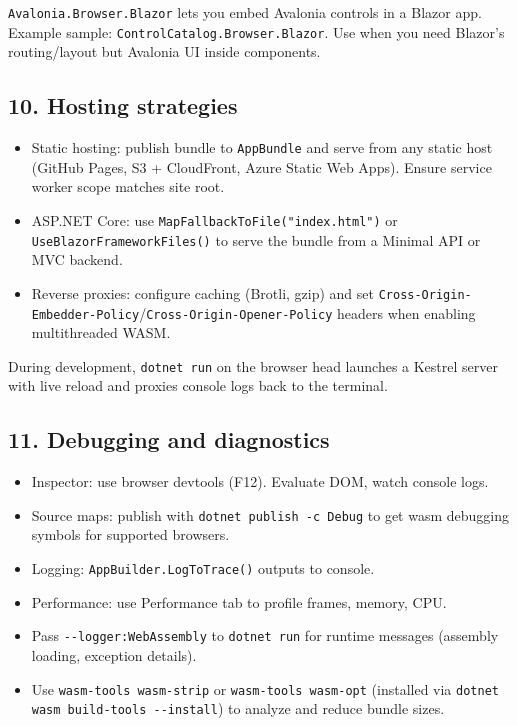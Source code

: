 \passthrough{\lstinline!Avalonia.Browser.Blazor!} lets you embed
Avalonia controls in a Blazor app. Example sample:
\passthrough{\lstinline!ControlCatalog.Browser.Blazor!}. Use when you
need Blazor's routing/layout but Avalonia UI inside components.

\subsection{10. Hosting strategies}\label{hosting-strategies}

\begin{itemize}
\tightlist
\item
  Static hosting: publish bundle to \passthrough{\lstinline!AppBundle!}
  and serve from any static host (GitHub Pages, S3 + CloudFront, Azure
  Static Web Apps). Ensure service worker scope matches site root.
\item
  ASP.NET Core: use
  \passthrough{\lstinline!MapFallbackToFile("index.html")!} or
  \passthrough{\lstinline!UseBlazorFrameworkFiles()!} to serve the
  bundle from a Minimal API or MVC backend.
\item
  Reverse proxies: configure caching (Brotli, gzip) and set
  \passthrough{\lstinline!Cross-Origin-Embedder-Policy!}/\passthrough{\lstinline!Cross-Origin-Opener-Policy!}
  headers when enabling multithreaded WASM.
\end{itemize}

During development, \passthrough{\lstinline!dotnet run!} on the browser
head launches a Kestrel server with live reload and proxies console logs
back to the terminal.

\subsection{11. Debugging and
diagnostics}\label{debugging-and-diagnostics}

\begin{itemize}
\tightlist
\item
  Inspector: use browser devtools (F12). Evaluate DOM, watch console
  logs.
\item
  Source maps: publish with
  \passthrough{\lstinline!dotnet publish -c Debug!} to get wasm
  debugging symbols for supported browsers.
\item
  Logging: \passthrough{\lstinline!AppBuilder.LogToTrace()!} outputs to
  console.
\item
  Performance: use Performance tab to profile frames, memory, CPU.
\item
  Pass \passthrough{\lstinline!--logger:WebAssembly!} to
  \passthrough{\lstinline!dotnet run!} for runtime messages (assembly
  loading, exception details).
\item
  Use \passthrough{\lstinline!wasm-tools wasm-strip!} or
  \passthrough{\lstinline!wasm-tools wasm-opt!} (installed via
  \passthrough{\lstinline!dotnet wasm build-tools --install!}) to
  analyze and reduce bundle sizes.
\end{itemize}

